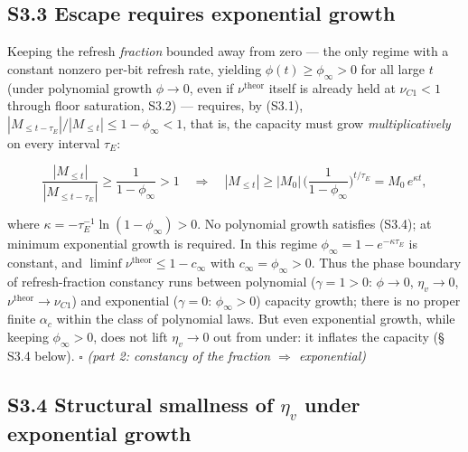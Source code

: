 \documentclass[12pt]{iopart}
\providecommand{\texorpdfstring}[2]{#1}
\begin{document}
\subsection{S3.3 Escape requires exponential growth}\label{s3.3-escape-requires-exponential-growth}



Keeping the refresh \emph{fraction} bounded away from zero --- the only regime with a constant nonzero per-bit refresh rate, yielding \(\phi(t) \ge \phi_\infty > 0\) for all large \(t\) (under polynomial growth \(\phi \to 0\), even if \(\nu^{\text{theor}}\) itself is already held at \(\nu_{C1} < 1\) through floor saturation, S3.2) --- requires, by (S3.1), \(|M_{\le t-\tau_E}|/|M_{\le t}| \le 1 - \phi_\infty < 1\), that is, the capacity must grow \emph{multiplicatively} on every interval \(\tau_E\):



\begin{equation}\frac{|M_{\le t}|}{|M_{\le t-\tau_E}|} \ge \frac{1}{1-\phi_\infty} > 1 \quad\Longrightarrow\quad |M_{\le t}| \ge |M_0|\,\Big(\frac{1}{1-\phi_\infty}\Big)^{t/\tau_E} = M_0\,e^{\kappa t}, \tag{S3.4}\end{equation}



where \(\kappa = -\tau_E^{-1}\ln(1-\phi_\infty) > 0\). No polynomial growth satisfies (S3.4); at minimum exponential growth is required. In this regime \(\phi_\infty = 1 - e^{-\kappa\tau_E}\) is constant, and \(\liminf\nu^{\text{theor}} \le 1 - c_\infty\) with \(c_\infty = \phi_\infty > 0\). Thus the phase boundary of refresh-fraction constancy runs between polynomial (\(\gamma = 1 > 0\): \(\phi \to 0\), \(\eta_v \to 0\), \(\nu^{\text{theor}} \to \nu_{C1}\)) and exponential (\(\gamma = 0\): \(\phi_\infty > 0\)) capacity growth; there is no proper finite \(\alpha_c\) within the class of polynomial laws. But even exponential growth, while keeping \(\phi_\infty > 0\), does not lift \(\eta_v \to 0\) out from under: it inflates the capacity (§ S3.4 below). \(\square\) \emph{(part 2: constancy of the fraction \(\Rightarrow\) exponential)}



\subsection{\texorpdfstring{S3.4 Structural smallness of \(\eta_v\) under exponential growth}{S3.4 Structural smallness of \textbackslash eta\_v under exponential growth}}\label{s3.4-structural-smallness-of-eta_v-under-exponential-growth}
\end{document}
